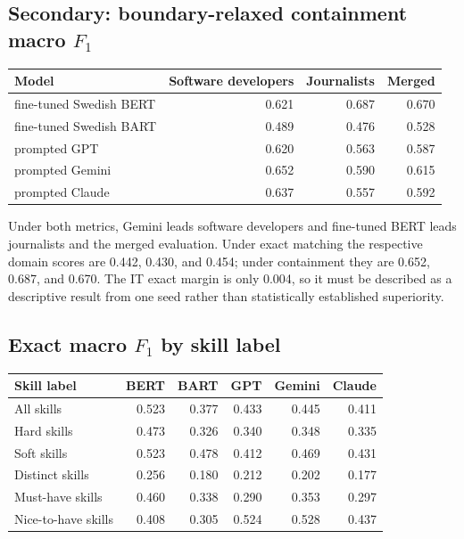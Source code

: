 \documentclass[11pt,a4paper]{article}
\begin{document}
\subsection*{Secondary: boundary-relaxed containment macro $F_1$}
\begin{center}
\begin{tabular}{lrrr}
\toprule
Model & Software developers & Journalists & Merged \\
\midrule
fine-tuned Swedish BERT & 0.621 & 0.687 & 0.670 \\
fine-tuned Swedish BART & 0.489 & 0.476 & 0.528 \\
prompted GPT & 0.620 & 0.563 & 0.587 \\
prompted Gemini & 0.652 & 0.590 & 0.615 \\
prompted Claude & 0.637 & 0.557 & 0.592 \\
\bottomrule
\end{tabular}
\end{center}

Under both metrics, Gemini leads software developers and fine-tuned BERT leads
journalists and the merged evaluation. Under exact matching the respective
domain scores are 0.442, 0.430, and 0.454; under containment they are 0.652,
0.687, and 0.670. The IT exact margin is only 0.004, so it must be described as
a descriptive result from one seed rather than statistically established
superiority.

\subsection*{Exact macro $F_1$ by skill label}
\begin{center}
\scriptsize
\begin{tabular}{lrrrrr}
\toprule
Skill label & BERT & BART & GPT & Gemini & Claude \\
\midrule
All skills & 0.523 & 0.377 & 0.433 & 0.445 & 0.411 \\
Hard skills & 0.473 & 0.326 & 0.340 & 0.348 & 0.335 \\
Soft skills & 0.523 & 0.478 & 0.412 & 0.469 & 0.431 \\
Distinct skills & 0.256 & 0.180 & 0.212 & 0.202 & 0.177 \\
Must-have skills & 0.460 & 0.338 & 0.290 & 0.353 & 0.297 \\
Nice-to-have skills & 0.408 & 0.305 & 0.524 & 0.528 & 0.437 \\
\bottomrule
\end{tabular}
\end{center}
\end{document}
